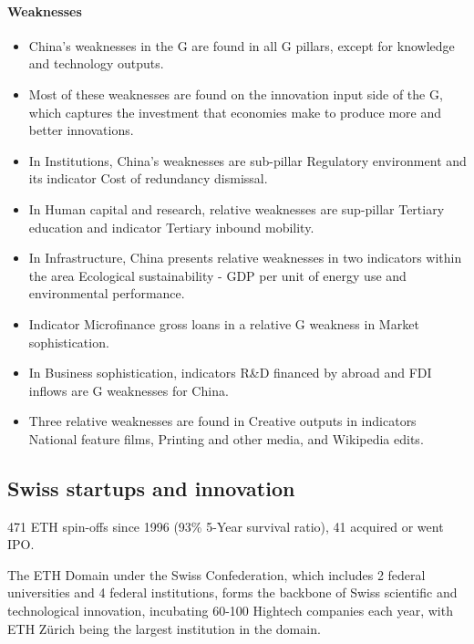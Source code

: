 \paragraph{Weaknesses}

\begin{itemize}
    \item China's weaknesses in the G are found in all G
        pillars, except for knowledge and technology outputs.
    \item Most of these weaknesses are found on the innovation input side of
        the G, which captures the investment that economies
        make to produce more and better innovations.
    \item In Institutions, China's weaknesses are sub-pillar Regulatory
        environment and its indicator Cost of redundancy dismissal.
    \item In Human capital and research, relative weaknesses are sup-pillar
        Tertiary education and indicator Tertiary inbound mobility.
    \item In Infrastructure, China presents relative weaknesses in two
        indicators within the area Ecological sustainability - GDP per unit
        of energy use and environmental performance.
    \item Indicator Microfinance gross loans in a relative G
        weakness in Market sophistication.
    \item In Business sophistication, indicators R\&D financed by abroad
        and FDI inflows are G weaknesses for China.
    \item Three relative weaknesses are found in Creative outputs in indicators
        National feature films, Printing and other media, and Wikipedia edits.
\end{itemize}

\subsection{Swiss startups and innovation}

471 ETH spin-offs since 1996 (93\% 5-Year survival ratio), 41 acquired or went IPO.

The ETH Domain under the Swiss Confederation, which includes 2 federal universities
and 4 federal institutions, forms the backbone of Swiss scientific and
technological innovation, incubating 60-100 Hightech companies each year, with
ETH Zürich being the largest institution in the domain.


